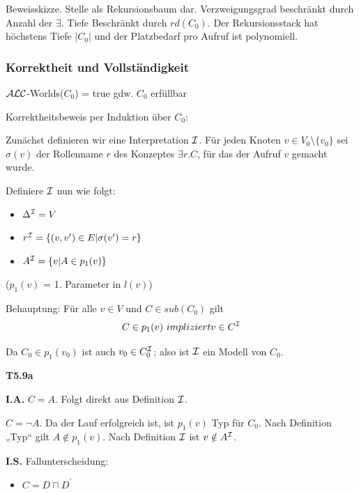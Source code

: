 Beweisskizze. Stelle als Rekursionsbaum dar. Verzweigungsgrad beschränkt durch Anzahl der $\exists$. Tiefe Beschränkt durch $rd(C_{0})$. Der Rekursionsstack hat höchstens Tiefe $\left| C_{0} \right|$ und der Platzbedarf pro Aufruf ist polynomiell.

\subsubsection{Korrektheit und Vollständigkeit}\label{proposition-5.18}

\begin{proposition}
$\mathcal{A}\mathcal{L}\mathcal{C}$-Worlds($C_0$) = true gdw. $C_0$ erfüllbar
\end{proposition}

Korrektheitsbeweis per Induktion über $C_{0}$:

Zunächst definieren wir eine Interpretation $\mathcal{I}$. Für jeden Knoten $v \in V_0 \setminus \{v_0\}$ sei $\sigma (v)$ der Rollenname $r$ des Konzeptes $\exists r.C$, für das der Aufruf $v$ gemacht wurde.

Definiere $\mathcal{I}$ nun wie folgt:

\begin{itemize}
  \item $\Delta^{\mathcal{I}} = V$
  \item $r^{\mathcal{I}} = \{(v,v')\in E | \sigma (v') = r\}$
  \item $A^{\mathcal{I}} = \{v | A \in p_1(v)\}$
\end{itemize}

($p_1(v)$ = 1. Parameter in $l(v)$)

Behauptung: Für alle $v \in V$ und $C \in sub(C_0)$ gilt $$C \in p_1(v)\ impliziert v \in C^{\mathcal{I}}$$

Da $C_0 \in p_1(v_0)$ ist auch $v_0 \in C_0^{\mathcal{I}}$; also ist $\mathcal{I}$ ein Modell von $C_0$.

\textbf{T5.9a}

\textbf{I.A.} $C = A$. Folgt direkt aus Definition $\mathcal{I}$.

$C = \neg A$. Da der Lauf erfolgreich ist, ist
$p_{1}\left( v \right)$ Typ für $C_{0}$. Nach Definition „Typ`` gilt
$A \notin p_{1}\left( v \right)$. Nach Definition $\mathcal{I}$ ist
$v \notin A^{\mathcal{I}}$.

\textbf{I.S.} Fallunterscheidung:

\begin{itemize}
\item
  $C = D \sqcap D^{'}$
\end{itemize}

